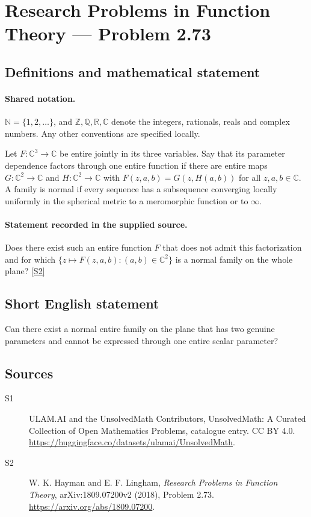 \documentclass[11pt]{article}
\newcommand{\sref}[2]{\hyperlink{source:#1:#2}{[S#2]}}
\begin{document}
\section{Research Problems in Function Theory — Problem 2.73}\label{statement}

\subsection{Definitions and mathematical statement}

\paragraph{Shared notation.}$\mathbb N=\{1,2,\ldots\}$, and $\mathbb Z,\mathbb Q,\mathbb R,\mathbb C$ denote the integers, rationals, reals and complex numbers. Any other conventions are specified locally.


Let $F:\mathbb C^3\to\mathbb C$ be entire jointly in its three variables. Say that its parameter dependence factors through one entire function if there are entire maps $G:\mathbb C^2\to\mathbb C$ and $H:\mathbb C^2\to\mathbb C$ with $F(z,a,b)=G(z,H(a,b))$ for all $z,a,b\in\mathbb C$. A family is normal if every sequence has a subsequence converging locally uniformly in the spherical metric to a meromorphic function or to $\infty$.
\paragraph{Statement recorded in the supplied source.}
Does there exist such an entire function $F$ that does not admit this factorization and for which $\{z\mapsto F(z,a,b):(a,b)\in\mathbb C^2\}$ is a normal family on the whole plane? \sref{statement}{2}
\subsection{Short English statement}
Can there exist a normal entire family on the plane that has two genuine parameters and cannot be expressed through one entire scalar parameter?
\subsection{Sources}
\begin{description}
\item[\hypertarget{source:statement:1}{S1}] ULAM.AI and the UnsolvedMath Contributors, UnsolvedMath: A Curated Collection of Open Mathematics Problems, catalogue entry. CC BY 4.0. \url{https://huggingface.co/datasets/ulamai/UnsolvedMath}.
\item[\hypertarget{source:statement:2}{S2}] W. K. Hayman and E. F. Lingham, \emph{Research Problems in Function Theory}, arXiv:1809.07200v2 (2018), Problem 2.73. \url{https://arxiv.org/abs/1809.07200}.
\end{description}
\label{end:statement}
\end{document}
